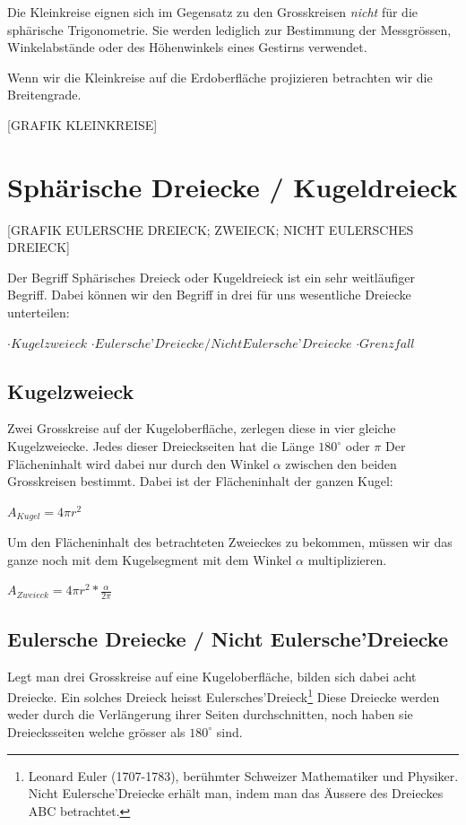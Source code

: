 \begin{refsection}
Die Kleinkreise eignen sich im Gegensatz zu den Grosskreisen \textit{nicht} für die sphärische Trigonometrie. 
Sie werden lediglich zur Bestimmung der Messgrössen, Winkelabstände oder des Höhenwinkels eines Gestirns verwendet. 

Wenn wir die Kleinkreise auf die Erdoberfläche projizieren betrachten wir die Breitengrade.

[GRAFIK KLEINKREISE]


\section{Sphärische Dreiecke / Kugeldreieck}

[GRAFIK EULERSCHE DREIECK; ZWEIECK; NICHT EULERSCHES DREIECK]

Der Begriff Sphärisches Dreieck oder Kugeldreieck ist ein sehr weitläufiger Begriff. 
Dabei können wir den Begriff in drei für uns wesentliche Dreiecke unterteilen:

$\cdot Kugelzweieck$
$\cdot Eulersche’Dreiecke / Nicht Eulersche’Dreiecke$
$\cdot Grenzfall$


\subsection{Kugelzweieck}

Zwei Grosskreise auf der Kugeloberfläche, zerlegen diese in vier gleiche Kugelzweiecke. 
Jedes dieser Dreieckseiten hat die Länge
$180^{\circ}$ oder $\pi$
Der Flächeninhalt wird dabei nur durch den Winkel $\alpha$ zwischen den beiden Grosskreisen bestimmt.
Dabei ist der Flächeninhalt der ganzen Kugel:

$A_{ Kugel } = 4 \pi r^{2}$

Um den Flächeninhalt des betrachteten Zweieckes zu bekommen, 
müssen wir das ganze noch mit dem Kugelsegment mit dem Winkel $\alpha$ multiplizieren.

$A_{ Zweieck } = 4 \pi r^{2} * \frac{ \alpha }{ 2 \pi }$


\subsection{Eulersche Dreiecke / Nicht Eulersche’Dreiecke}


Legt man drei Grosskreise auf eine Kugeloberfläche, bilden sich dabei acht Dreiecke. 
Ein solches Dreieck heisst Eulersches’Dreieck\footnote{%
Leonard Euler (1707-1783), berühmter Schweizer Mathematiker und Physiker. 
Nicht Eulersche’Dreiecke erhält man, indem man das Äussere des Dreieckes ABC betrachtet.} 
Diese Dreiecke werden weder durch die Verlängerung ihrer Seiten durchschnitten, 
noch haben sie Dreiecksseiten welche grösser als $180^{\circ}$ sind.


\end{refsection}

